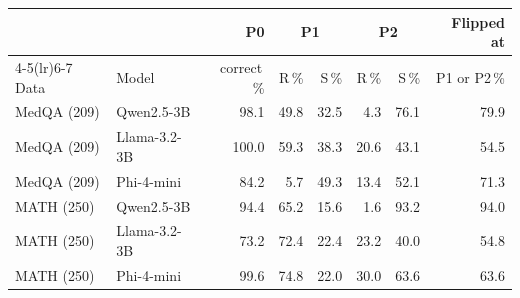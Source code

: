 \begin{tabular}{ll r rr rr r}
\toprule
& & P0 & \multicolumn{2}{c}{P1} & \multicolumn{2}{c}{P2} & Flipped at\\
\cmidrule(lr){4-5}\cmidrule(lr){6-7}
Data & Model & correct\,\% & R\,\% & S\,\% & R\,\% & S\,\% & P1 or P2\,\%\\
\midrule
MedQA (209) & Qwen2.5-3B & 98.1 & 49.8 & 32.5 & 4.3 & 76.1 & 79.9\\
MedQA (209) & Llama-3.2-3B & 100.0 & 59.3 & 38.3 & 20.6 & 43.1 & 54.5\\
MedQA (209) & Phi-4-mini & 84.2 & 5.7 & 49.3 & 13.4 & 52.1 & 71.3\\
\midrule
MATH (250) & Qwen2.5-3B & 94.4 & 65.2 & 15.6 & 1.6 & 93.2 & 94.0\\
MATH (250) & Llama-3.2-3B & 73.2 & 72.4 & 22.4 & 23.2 & 40.0 & 54.8\\
MATH (250) & Phi-4-mini & 99.6 & 74.8 & 22.0 & 30.0 & 63.6 & 63.6\\
\bottomrule
\end{tabular}